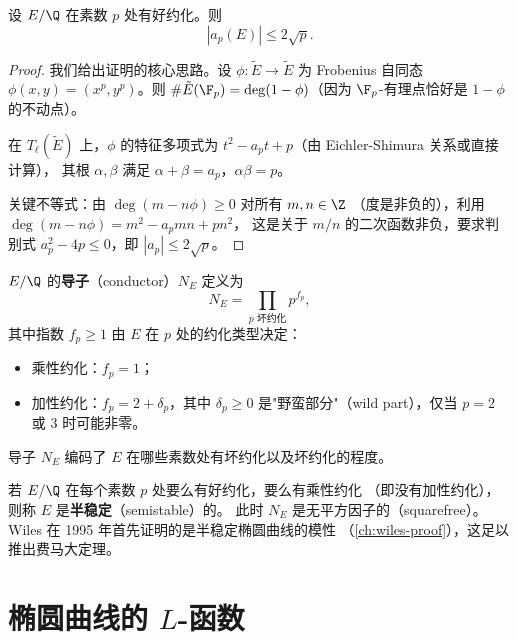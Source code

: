 \begin{theorem}[Hasse 界]
\label{thm:hasse-bound}
设 $E/\Q$ 在素数 $p$ 处有好约化。则
\[
  |a_p(E)| \leq 2\sqrt{p}.
\]
\end{theorem}

\begin{proof}
我们给出证明的核心思路。设 $\phi\colon \tilde{E} \to \tilde{E}$ 为
Frobenius 自同态 $\phi(x, y) = (x^p, y^p)$。则
$\#\tilde{E}(\F_p) = \deg(1 - \phi)$（因为 $\F_p$-有理点恰好是
$1 - \phi$ 的不动点）。

在 $T_\ell(\tilde{E})$ 上，$\phi$ 的特征多项式为
$t^2 - a_p t + p$（由 Eichler-Shimura 关系或直接计算），
其根 $\alpha, \beta$ 满足 $\alpha + \beta = a_p$，$\alpha\beta = p$。

关键不等式：由 $\deg(m - n\phi) \geq 0$ 对所有 $m, n \in \Z$
（度是非负的），利用 $\deg(m - n\phi) = m^2 - a_p mn + pn^2$，
这是关于 $m/n$ 的二次函数非负，要求判别式
$a_p^2 - 4p \leq 0$，即 $|a_p| \leq 2\sqrt{p}$。
\end{proof}

\begin{definition}[导子]
\label{def:conductor}
$E/\Q$ 的\textbf{导子}（conductor）$N_E$ 定义为
\[
  N_E = \prod_{p \text{ 坏约化}} p^{f_p},
\]
其中指数 $f_p \geq 1$ 由 $E$ 在 $p$ 处的约化类型决定：
\begin{itemize}
  \item 乘性约化：$f_p = 1$；
  \item 加性约化：$f_p = 2 + \delta_p$，其中 $\delta_p \geq 0$
    是"野蛮部分"（wild part），仅当 $p = 2$ 或 $3$ 时可能非零。
\end{itemize}
导子 $N_E$ 编码了 $E$ 在哪些素数处有坏约化以及坏约化的程度。
\end{definition}

\begin{remark}[半稳定椭圆曲线]
\label{rem:semistable}
若 $E/\Q$ 在每个素数 $p$ 处要么有好约化，要么有乘性约化
（即没有加性约化），则称 $E$ 是\textbf{半稳定}（semistable）的。
此时 $N_E$ 是无平方因子的（squarefree）。
Wiles 在 1995 年首先证明的是半稳定椭圆曲线的模性
（\cref{ch:wiles-proof}），这足以推出费马大定理。
\end{remark}


\section{椭圆曲线的 $L$-函数}
\label{sec:ec-l-function}

